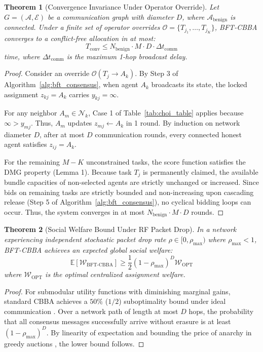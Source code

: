 \documentclass[journal,10pt,twocolumn]{IEEEtran}
\newtheorem{theorem}{Theorem}
\begin{document}
\begin{theorem}[Convergence Invariance Under Operator Override]
Let $G = (\mathcal{A}, \mathcal{E})$ be a communication graph with diameter $D$, where $\mathcal{A}_{\text{benign}}$ is connected. Under a finite set of operator overrides $\mathcal{O} = \{T_{j_1}, \dots, T_{j_K}\}$, BFT-CBBA converges to a conflict-free allocation in at most:
\begin{equation}
T_{\text{conv}} \le N_{\text{benign}} \cdot M \cdot D \cdot \Delta t_{\text{comm}}
\end{equation}
time, where $\Delta t_{\text{comm}}$ is the maximum 1-hop broadcast delay.
\end{theorem}
\begin{proof}
Consider an override $\mathcal{O}(T_j \to A_k)$. By Step 3 of Algorithm~\ref{alg:bft_consensus}, when agent $A_k$ broadcasts its state, the locked assignment $z_{kj} = A_k$ carries $y_{kj} = \infty$. 

For any neighbor $A_m \in \mathcal{N}_k$, Case 1 of Table~\ref{tab:choi_table} applies because $\infty > y_{mj}$. Thus, $A_m$ updates $z_{mj} \gets A_k$ in 1 round. By induction on network diameter $D$, after at most $D$ communication rounds, every connected honest agent satisfies $z_{ij} = A_k$.

For the remaining $M - K$ unconstrained tasks, the score function satisfies the DMG property (Lemma 1). Because task $T_j$ is permanently claimed, the available bundle capacities of non-selected agents are strictly unchanged or increased. Since bids on remaining tasks are strictly bounded and non-increasing upon cascading release (Step 5 of Algorithm~\ref{alg:bft_consensus}), no cyclical bidding loops can occur. Thus, the system converges in at most $N_{\text{benign}} \cdot M \cdot D$ rounds.
\end{proof}

\begin{theorem}[Social Welfare Bound Under RF Packet Drop]
In a network experiencing independent stochastic packet drop rate $\rho \in [0, \rho_{\max})$ where $\rho_{\max} < 1$, BFT-CBBA achieves an expected global social welfare:
\begin{equation}
\mathbb{E}[\mathcal{W}_{\text{BFT-CBBA}}] \ge \frac{1}{2} (1 - \rho_{\max})^D \mathcal{W}_{\text{OPT}}
\end{equation}
where $\mathcal{W}_{\text{OPT}}$ is the optimal centralized assignment welfare.
\end{theorem}
\begin{proof}
For submodular utility functions with diminishing marginal gains, standard CBBA achieves a $50\%$ ($1/2$) suboptimality bound under ideal communication \cite{choi2009cbba}. Over a network path of length at most $D$ hops, the probability that all consensus messages successfully arrive without erasure is at least $(1 - \rho_{\max})^D$. By linearity of expectation and bounding the price of anarchy in greedy auctions \cite{gerkey2004formal}, the lower bound follows.
\end{proof}
\end{document}
